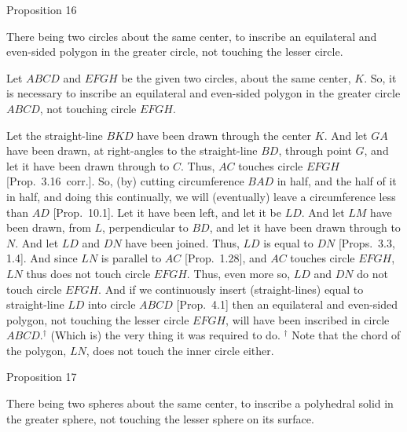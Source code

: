 
\begin{center}
{\large Proposition 16}
\end{center}

There being two circles about the same center, to inscribe an equilateral and even-sided polygon in the
greater circle, not touching the lesser circle.

\epsfysize=2in
\centerline{}

Let $ABCD$ and $EFGH$ be the given two circles, about the same center, $K$. So, it is necessary
to inscribe an equilateral and even-sided polygon in the greater circle $ABCD$, not touching circle $EFGH$.

Let the straight-line $BKD$ have been drawn through the center $K$. And let $GA$ have been drawn, at right-angles to the
straight-line $BD$, through point $G$, and let it have been drawn through to $C$. Thus, $AC$ touches  circle $EFGH$ [Prop.~3.16~corr.]. 
So, (by) cutting circumference $BAD$ in half, and the half of it in half, and 
doing this continually, we will (eventually) leave
a circumference less than $AD$ [Prop.~10.1]. Let it have been left, and let it be $LD$. And let $LM$ have been drawn, from $L$, 
perpendicular to $BD$, and let it have been drawn through to $N$. And let $LD$ and $DN$ have been joined. 
Thus, $LD$ is equal to $DN$ [Props.~3.3, 1.4]. 
And since $LN$ is
parallel to $AC$ [Prop.~1.28], and $AC$ touches circle $EFGH$, $LN$ thus does not touch circle $EFGH$. Thus,
even more so, $LD$ and $DN$ do not touch circle $EFGH$. And if we continuously insert (straight-lines) equal to straight-line
$LD$ into circle $ABCD$ [Prop.~4.1] then an equilateral and even-sided polygon, not touching
the lesser circle $EFGH$, will have been inscribed in circle $ABCD$.$^\dag$ (Which is) the very thing it was required to do.
{\footnotesize\noindent$^\dag$ Note that the chord of the polygon, $LN$, does not touch the inner circle either.}


\begin{center}
{\large Proposition 17}
\end{center}

There being two spheres about the same center, to inscribe  a polyhedral solid in the greater
sphere,  not
touching the lesser sphere on its surface.

\epsfysize=3.4in
\centerline{}

